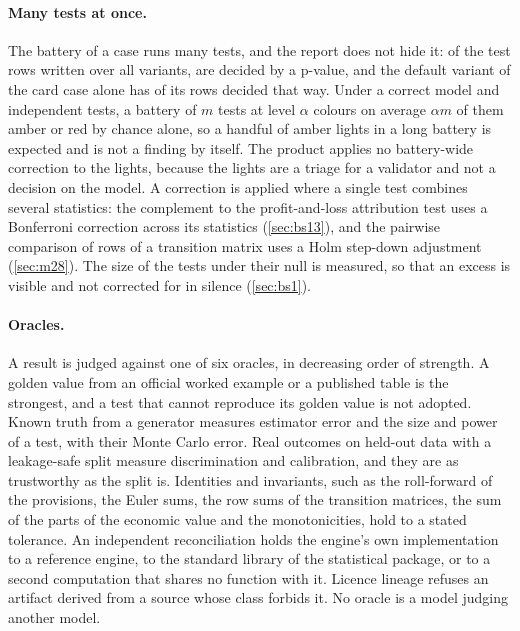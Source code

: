 \paragraph{Many tests at once.} The battery of a case runs many tests, and the report does not hide it: of the \rsTestRows{} test rows written over all variants, \rsPTestRows{} are decided by a p-value, and the default variant of the card case alone has \rsCOnePTests{} of its \rsCOneTests{} rows decided that way. Under a correct model and independent tests, a battery of $m$ tests at level $\alpha$ colours on average $\alpha m$ of them amber or red by chance alone, so a handful of amber lights in a long battery is expected and is not a finding by itself. The product applies no battery-wide correction to the lights, because the lights are a triage for a validator and not a decision on the model. A correction is applied where a single test combines several statistics: the complement to the profit-and-loss attribution test uses a Bonferroni correction across its statistics (\cref{sec:bs13}), and the pairwise comparison of rows of a transition matrix uses a Holm step-down adjustment (\cref{sec:m28}). The size of the tests under their null is measured, so that an excess is visible and not corrected for in silence (\cref{sec:bs1}).

\paragraph{Oracles.} A result is judged against one of six oracles, in decreasing order of strength. A golden value from an official worked example or a published table is the strongest, and a test that cannot reproduce its golden value is not adopted. Known truth from a generator measures estimator error and the size and power of a test, with their Monte Carlo error. Real outcomes on held-out data with a leakage-safe split measure discrimination and calibration, and they are as trustworthy as the split is. Identities and invariants, such as the roll-forward of the provisions, the Euler sums, the row sums of the transition matrices, the sum of the parts of the economic value and the monotonicities, hold to a stated tolerance. An independent reconciliation holds the engine's own implementation to a reference engine, to the standard library of the statistical package, or to a second computation that shares no function with it. Licence lineage refuses an artifact derived from a source whose class forbids it. No oracle is a model judging another model.

